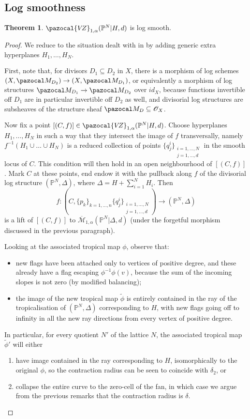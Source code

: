 \documentclass[11pt]{amsart}
\newcommand{\oM}{\overline{\mathcal{M}}}
\newcommand{\PP}{\mathbb P}
\newcommand{\VZ}{\pazocal{V\!Z}}
\newcommand{\OO}{\mathcal{O}}
\renewcommand{\to}{\rightarrow}
\theoremstyle{definition}
\newtheorem{thm}{Theorem}[section]
\theoremstyle{definition}
\begin{document}
\subsection{Log smoothness}
\begin{thm}
 $\VZ_{1,\alpha}(\PP^N|H,d)$ is log smooth.
\end{thm}
\begin{proof}
 We reduce to the situation dealt with in \cite{RSPW2} by adding generic extra hyperplanes $H_1,\ldots, H_N$.
 
 First, note that, for divisors $D_1\subseteq D_2$ in $X$, there is a morphism of log schemes $(X,\pazocal M_{D_2})\to (X,\pazocal M_{D_1})$, or equivalently a morphism of log structures $\pazocal M_{D_1}\to\pazocal M_{D_2}$ over $i\!d_X$, because functions invertible off $D_1$ are in particular invertible off $D_2$ as well, and divisorial log structures are subsheaves of the structure sheaf $\pazocal M_{D}\subseteq\OO_X$.
 
 Now fix a point $[(C,f)]\in\VZ_{1,\alpha}(\PP^N|H,d)$. Choose hyperplanes $H_1,\ldots, H_N$ in such a way that they intersect the image of $f$ transversally, namely $f^{-1}(H_1\cup\ldots\cup H_N)$ is a reduced collection of points $\{q^i_j\}_{\substack{i=1,\ldots,N \\ j=1,\ldots,d}}$ in the smooth locus of $C$. This condition will then hold in an open neighbourhood of $[(C,f)]$. Mark $C$ at these points, end endow it with the pullback along $f$ of the divisorial log structure $(\PP^N,\Delta)$, where $\Delta=H+\sum_{i=1}^N H_i$. Then \[f\colon (C,\{p_k\}_{k=1,\ldots,n}\{q^i_j\}_{\substack{i=1,\ldots,N \\ j=1,\ldots,d}})\to(\PP^N,\Delta)\]
 is a lift of $[(C,f)]$ to $\oM_{1,\alpha}(\PP^N|\Delta,d)$ (under the forgetful morphism discussed in the previous paragraph).
 
 Looking at the associated tropical map $\phi$, observe that:
 \begin{itemize}
  \item new flags have been attached only to vertices of positive degree, and these already have a flag escaping $\phi^{-1}\phi(v)$, because the sum of the incoming slopes is not zero (by modified balancing);
  \item the image of the new tropical map $\tilde\phi$ is entirely contained in the ray of the tropicalisation of $(\PP^N,\Delta)$ corresponding to $H$, with new flags going off to infinity in all the new ray directions from every vertex of positive degree.
 \end{itemize}
 In particular, for every quotient $N'$ of the lattice $N$, the associated tropical map $\tilde\phi'$ will either
 \begin{enumerate}
  \item have image contained in the ray corresponding to $H$, isomorphically to the original $\phi$, so the contraction radius can be seen to coincide with $\delta_2$, or
  \item collapse the entire curve to the zero-cell of the fan, in which case we argue from the previous remarks that the contraction radius is $\delta$.
 \end{enumerate}


\end{proof}
\end{document}
